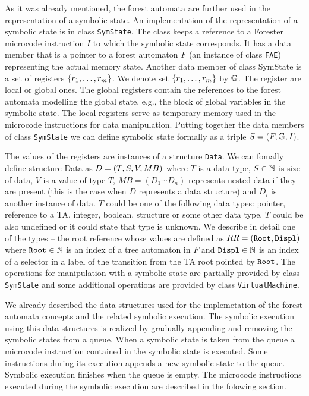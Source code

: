As it was already mentioned, the forest automata are further used in the representation of a symbolic state.
An implementation of the representation of a symbolic state is in class {\tt SymState}.
The class keeps a reference to a Forester microcode instruction $I$ to which the symbolic state corresponds.
It has a data member that is a pointer to a forest automaton $F$ (an instance of class {\tt FAE})
representing the actual memory state.
Another data member of class SymState is a set of registers $\{r_1, \ldots, r_m\}$.
We denote set $\{r_1, \ldots, r_m\}$ by $\mathbb{G}$. 
The register are local or global ones.
The global registers contain the references to the forest automata modelling
the global state, e.g., the block of global variables in the symbolic state.
The local registers serve as temporary memory used in
the microcode instructions for data manipulation.
Putting together the data members of class {\tt SymState}
we can define symbolic state formally as a triple $S=(F, \mathbb{G}, I)$.

The values of the registers are instances of a structure {\tt Data}.
We can fomally define structure Data as $D = (T,S,V,MB)$ where
$T$ is a data type,
$S \in \mathbb{N}$ is size of data,
$V$ is a value of type $T$,
$MB=(D_1 \cdots D_n)$ represents nested data if they are present (this is the case when $D$ represents a data structure)
and $D_i$ is another instance of data.
$T$ could be one of the following data types: pointer, reference to a TA, integer, boolean, structure or some other data type.
$T$ could be also undefined or it could state that type is unknown.
We describe in detail one of the types -- the root reference
whose values are defined as $RR=({\tt Root},{\tt Displ})$
where ${\tt Root} \in \mathbb{N}$ is an index of a tree automaton in $F$
and ${\tt Displ} \in \mathbb{N}$ is an index of a selector in a label of
the transition from the TA root pointed by ${\tt Root}$.
The operations for manipulation with a symbolic state are partially provided by class {\tt SymState}
and some additional operations are provided by class {\tt VirtualMachine}.

We already described the data structures used for the implemetation of the forest automata concepts
and the related symbolic execution.
The symbolic execution using this data structures is realized by gradually appending
and removing the symbolic states from a queue.
When a symbolic state is taken from the queue a microcode instruction contained in
the symbolic state is executed.
Some instructions during its execution appends a new symbolic state to the queue.
Symbolic execution finishes when the queue is empty.
The microcode instructions executed during the symbolic execution are described in the folowing section.


